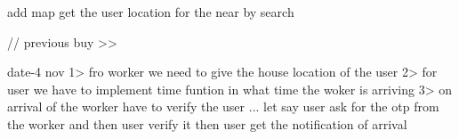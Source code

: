 add map 
get the user location for the near by search 

// previous buy >>

date-4 nov 
1> fro worker we need to give the house location of the user
2> for user we have to implement time  funtion in what time the woker is arriving
3> on arrival of the worker have to verify the user ... let say user ask for the otp from the worker and then user verify it then user get the notification of arrival  


